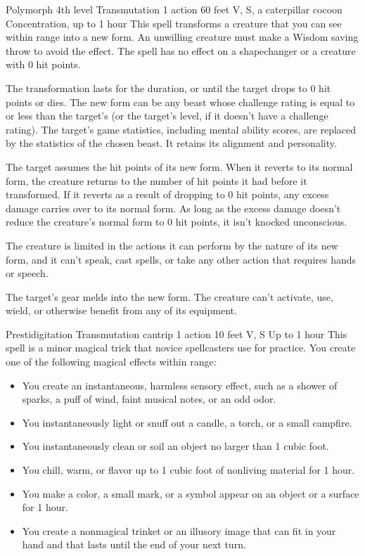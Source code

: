 \documentclass[10pt,a4paper,twoside,bg=print,twocolumn,openany,nodeprecatedcode]{dndbook}
\begin{document}


\DndSpellHeader%
{Polymorph}
{4th level Transmutation}
{1 action}
{60 feet}
{V, S, a caterpillar cocoon}
{Concentration, up to 1 hour}
This spell transforms a creature that you can see within range into a new form. An unwilling creature must make a Wisdom saving throw to avoid the effect. The spell has no effect on a shapechanger or a creature with 0 hit points.

The transformation lasts for the duration, or until the target drops to 0 hit points or dies. The new form can be any beast whose challenge rating is equal to or less than the target's (or the target's level, if it doesn't have a challenge rating). The target's game statistics, including mental ability scores, are replaced by the statistics of the chosen beast. It retains its alignment and personality.

The target assumes the hit points of its new form. When it reverts to its normal form, the creature returns to the number of hit points it had before it transformed. If it reverts as a result of dropping to 0 hit points, any excess damage carries over to its normal form. As long as the excess damage doesn't reduce the creature's normal form to 0 hit points, it isn't knocked unconscious.

The creature is limited in the actions it can perform by the nature of its new form, and it can't speak, cast spells, or take any other action that requires hands or speech.

The target's gear melds into the new form. The creature can't activate, use, wield, or otherwise benefit from any of its equipment.



\DndSpellHeader%
{Prestidigitation}
{Transmutation cantrip}
{1 action}
{10 feet}
{V, S}
{Up to 1 hour}
This spell is a minor magical trick that novice spellcasters use for practice. You create one of the following magical effects within range:


\begin{itemize}
\item You create an instantaneous, harmless sensory effect, such as a shower of sparks, a puff of wind, faint musical notes, or an odd odor.
\item You instantaneously light or snuff out a candle, a torch, or a small campfire.
\item You instantaneously clean or soil an object no larger than 1 cubic foot.
\item You chill, warm, or flavor up to 1 cubic foot of nonliving material for 1 hour.
\item You make a color, a small mark, or a symbol appear on an object or a surface for 1 hour.
\item You create a nonmagical trinket or an illusory image that can fit in your hand and that lasts until the end of your next turn.
\end{itemize}
\end{document}

